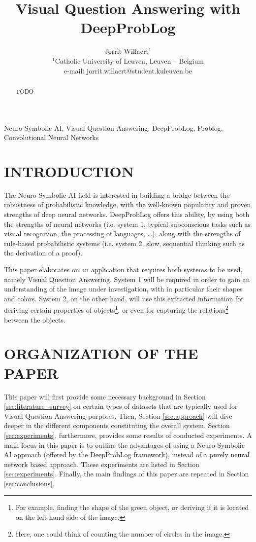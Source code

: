 \documentclass[english]{sobraep}
\title{Visual Question Answering with DeepProbLog}
\author{Jorrit Willaert$^{1}$ \\
	\normalsize $^{1}$Catholic University of Leuven, Leuven -- Belgium \\
	\normalsize e-mail: jorrit.willaert@student.kuleuven.be
}
\begin{document}
\maketitle


\begin{abstract}
	TODO
\end{abstract}

\begin{keywords}
	Neuro Symbolic AI, Visual Question Answering, DeepProbLog, Problog, Convolutional Neural Networks
\end{keywords}

\section{INTRODUCTION}
The Neuro Symbolic AI field is interested in building a bridge between the robustness of probabilistic knowledge, with the well-known popularity and proven strengths of deep neural networks. DeepProbLog \cite{deepproblog} offers this ability, by using both the strengths of neural networks (i.e. system 1, typical subconscious tasks such as visual recognition, the processing of languages, \dots), along with the strengths of rule-based probabilistic systems (i.e. system 2, slow, sequential thinking such as the derivation of a proof). 

This paper elaborates on an application that requires both systems to be used, namely Visual Question Answering. System 1 will be required in order to gain an understanding of the image under investigation, with in particular their shapes and colors. System 2, on the other hand, will use this extracted information for deriving certain properties of objects\footnote{For example, finding the shape of the green object, or deriving if it is located on the left hand side of the image.}, or even for capturing the relations\footnote{Here, one could think of counting the number of circles in the image.} between the objects. 

\section{ORGANIZATION OF THE PAPER}
This paper will first provide some necessary background in Section \ref{sec:literature_survey} on certain types of datasets that are typically used for Visual Question Answering purposes. Then, Section \ref{sec:approach} will dive deeper in the different components constituting the overall system. Section \ref{sec:experiments}, furthermore, provides some results of conducted experiments. A main focus in this paper is to outline the advantages of using a Neuro-Symbolic AI approach (offered by the DeepProbLog framework), instead of a purely neural network based approach. These experiments are listed in Section \ref{sec:experiments}. Finally, the main findings of this paper are repeated in Section \ref{sec:conclusions}.
\end{document}
